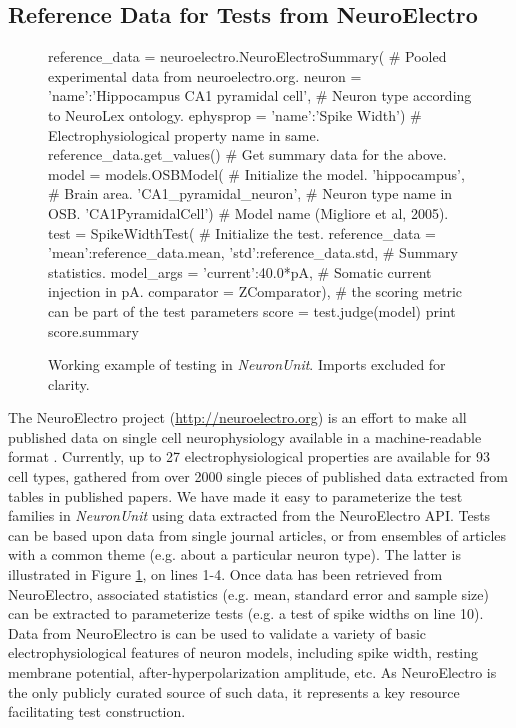\documentclass{frontiersSCNS}
\begin{document}
\subsection{Reference Data for Tests from NeuroElectro}\label{sec:neuroelectro} 
\begin{figure}
\begin{python}
reference_data = neuroelectro.NeuroElectroSummary( # Pooled experimental data from  neuroelectro.org. 
  neuron = {'name':'Hippocampus CA1 pyramidal cell'}, # Neuron type according to NeuroLex ontology.  
  ephysprop = {'name':'Spike Width'}) # Electrophysiological property name in same.
reference_data.get_values()  # Get summary data for the above. 
model = models.OSBModel( # Initialize the model.
        'hippocampus', # Brain area.  
        'CA1_pyramidal_neuron', # Neuron type name in OSB.  
        'CA1PyramidalCell') # Model name (Migliore et al, 2005).
test = SpikeWidthTest( # Initialize the test.    
	reference_data = {'mean':reference_data.mean, 'std':reference_data.std}, # Summary statistics.
	model_args = {'current':40.0*pA}, # Somatic current injection in pA.  
	comparator = ZComparator), # the scoring metric can be part of the test parameters 
score = test.judge(model)
print score.summary
\end{python}
\vspace{-15px}
\caption{Working example of testing in \textit{NeuronUnit}. Imports excluded for clarity.}
\label{fig:neuronunit_example}

\end{figure}
The NeuroElectro project (\url{http://neuroelectro.org}) is an effort to make all published data on single cell neurophysiology available in a machine-readable format \citep{tripathy_neuroelectro:_2012}.  
Currently, up to 27 electrophysiological properties are available for 93 cell types, gathered from over 2000 single pieces of published data extracted from tables in published papers. 
We have made it easy to parameterize the test families in \textit{Neuron\-Unit}  using data extracted from the NeuroElectro API. 
Tests can be based upon data from single journal articles, or from ensembles of articles with a common theme (e.g. about a particular neuron type). 
The latter is illustrated in Figure \ref{fig:neuronunit_example}, on lines 1-4. Once data has been retrieved from NeuroElectro, associated statistics (e.g. mean, standard error and sample size) can be extracted to parameterize tests (e.g. a test of spike widths on line 10). Data from NeuroElectro is can be used to validate a variety of basic electrophysiological features of neuron models, including spike width, resting membrane potential, after-hyperpolarization amplitude, etc. 
As NeuroElectro is the only publicly curated source of such data, it represents a key resource facilitating test construction.  
\end{document}
